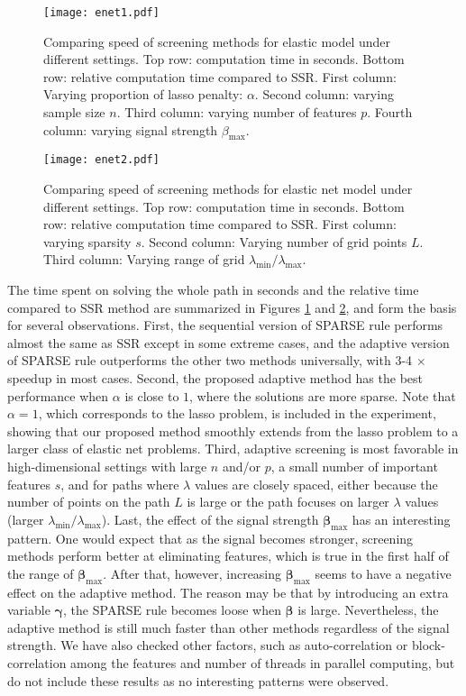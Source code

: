 \begin{figure}[ht]
    \centering
    \texttt{[image: enet1.pdf]}    \caption[Comparison of screening methods for elastic net in simulation 1]{Comparing speed of screening methods for elastic model under different settings. Top row: computation time in seconds. Bottom row: relative computation time compared to SSR. First column: Varying proportion of lasso penalty: $\alpha$. Second column: varying sample size $n$. Third column: varying number of features $p$. Fourth column: varying signal strength $\beta_{\max}$.}
    \label{fig:sim1}
\end{figure}

\begin{figure}[ht]
    \centering
    \texttt{[image: enet2.pdf]}    \caption[Comparison of screening methods for elastic net in simulation 2]{Comparing speed of screening methods for elastic net model under different settings. Top row: computation time in seconds. Bottom row: relative computation time compared to SSR. First column: varying sparsity $s$. Second column: Varying number of grid points $L$. Third column: Varying range of grid $\lambda_{\min}/\lambda_{\max}$.}
    \label{fig:sim2}
\end{figure}

The time spent on solving the whole path in seconds and the relative time compared to SSR method are summarized in Figures \ref{fig:sim1} and \ref{fig:sim2}, and form the basis for several observations. First, the sequential version of SPARSE rule performs almost the same as SSR except in some extreme cases, and the adaptive version of SPARSE rule outperforms the other two methods universally, with 3-4 $\times$ speedup in most cases. Second, the proposed adaptive method has the best performance when $\alpha$ is close to $1$, where the solutions are more sparse. Note that $\alpha=1$, which corresponds to the lasso problem, is included in the experiment, showing that our proposed method smoothly extends from the lasso problem to a larger class of elastic net problems. Third, adaptive screening is most favorable in high-dimensional settings with large $n$ and/or $p$, a small number of important features $s$, and for paths where $\lambda$ values are closely spaced, either because the number of points on the path $L$ is large or the path focuses on larger $\lambda$ values (larger $\lambda_{\min}/\lambda_{\max}$). Last, the effect of the signal strength $\boldsymbol\beta_{\max}$ has an interesting pattern. One would expect that as the signal becomes stronger, screening methods perform better at eliminating features, which is true in the first half of the range of $\boldsymbol\beta_{\max}$. After that, however, increasing $\boldsymbol\beta_{\max}$ seems to have a negative effect on the adaptive method. The reason may be that by introducing an extra variable $\boldsymbol\gamma$, the SPARSE rule becomes loose when $\boldsymbol\beta$ is large. Nevertheless, the adaptive method is still much faster than other methods regardless of the signal strength. We have also checked other factors, such as auto-correlation or block-correlation among the features and number of threads in parallel computing, but do not include these results as no interesting patterns were observed.

